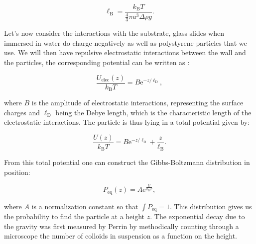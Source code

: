 \begin{equation}
	\ell_\mathrm{B} = \frac{k_\mathrm{B} T}{ \frac{4}{3} \pi a^3 \Delta \rho g}.
\end{equation}

Let's now consider the interactions with the substrate, glass slides when immersed in water do charge negatively as well as polystyrene particles that we use. We will then have repulsive electrostatic interactions between the wall and the particles, the corresponding potential can be written as  \cite{israelachvili_intermolecular_2015}:

\begin{equation}
	\frac{U_\mathrm{elec}(z)}{k_\mathrm{B}T} = B \mathrm{e}^{-z/\ell_\mathrm{D}},
\end{equation}


where $B$ is the amplitude of electrostatic interactions, representing the surface charges and $\ell_\mathrm{D}$ being the Debye length, which is the characteristic length of the electrostatic interactions. The particle is thus lying in a total potential given by:

\begin{equation}
	\frac{U(z)}{k_\mathrm{B}T} =   B \mathrm{e}^{-z/\ell_\mathrm{D}} +  \frac{z}{\ell_\mathrm{B}}.
\end{equation}

From this total potential one can construct the Gibbs-Boltzmann distribution in position:

\begin{equation}
	P_\mathrm{eq}(z) = A\mathrm{e}^
	{
		\frac{U}{k_\mathrm{B}T}	
	},
	\label{Eq:Peq}
\end{equation}

where $A$ is a normalization constant so that $\int P_\mathrm{eq} = 1$. This distribution gives us the probability to find the particle at a height $z$. The exponential decay due to the gravity was first measured by Perrin \cite{perrin_les_2014} by methodically counting through a microscope the number of colloids in suspension as a function on the height. 



